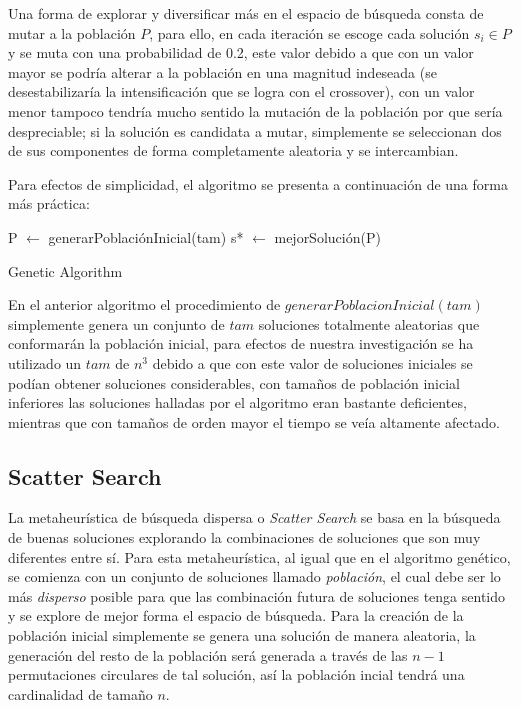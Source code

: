 \documentclass{ci5652}
\begin{document}
Una forma de explorar y diversificar más en el espacio de búsqueda consta de mutar a la población \(P\), para ello, en cada iteración se escoge cada solución \(s_{i} \in P\) y se muta con una probabilidad de 0.2, este valor debido a que con un valor mayor se podría alterar a la población en una magnitud indeseada (se desestabilizaría la intensificación que se logra con el crossover), con un valor menor tampoco tendría mucho sentido la mutación de la población por que sería despreciable; si la solución es candidata a mutar, simplemente se seleccionan dos de sus componentes de forma completamente aleatoria y se intercambian.

Para efectos de simplicidad, el algoritmo se presenta a continuación de una forma más práctica:

\begin{algorithm}
 \DontPrintSemicolon
 \vspace*{0.1cm}
 P $\leftarrow$ generarPoblaciónInicial(tam)\;
 s* $\leftarrow$ mejorSolución(P)\;
 
 \vspace*{0.1cm}
 \caption{Genetic Algorithm}
\end{algorithm}

En el anterior algoritmo el procedimiento de \(generarPoblacionInicial(tam)\) simplemente genera un conjunto de \(tam\) soluciones totalmente aleatorias que conformarán la población inicial, para efectos de nuestra investigación se ha utilizado un \(tam\) de \(n^{3}\) debido a que con este valor de soluciones iniciales se podían obtener soluciones considerables, con tamaños de población inicial inferiores las soluciones halladas por el algoritmo eran bastante deficientes, mientras que con tamaños de orden mayor el tiempo se veía altamente afectado.

\subsection{Scatter Search}

La metaheurística de búsqueda dispersa o \textit{Scatter Search} se basa en la búsqueda de buenas soluciones explorando la combinaciones de soluciones que son muy diferentes entre sí. Para esta metaheurística, al igual que en el algoritmo genético, se comienza con un conjunto de soluciones llamado \textit{población}, el cual debe ser lo más \textit{disperso} posible para que las combinación futura de soluciones tenga sentido y se explore de mejor forma el espacio de búsqueda. Para la creación de la población inicial simplemente se genera una solución de manera aleatoria, la generación del resto de la población será generada a través de las \(n - 1\) permutaciones circulares de tal solución, así la población incial tendrá una cardinalidad de tamaño \(n\).
\end{document}
